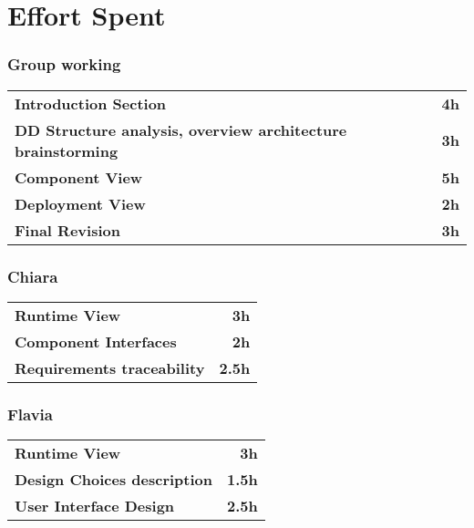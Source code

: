 \chapter{Effort Spent}
\subsection*{Group working}
\begin{table}[H]
    \begin{tabular}{lr}
        \toprule
        \textbf{Introduction Section}                                           & \textbf{4h} \\
        \textbf{DD Structure analysis, overview architecture brainstorming}     & \textbf{3h} \\
        \textbf{Component View}                                                 & \textbf{5h} \\
        \textbf{Deployment View}                                                  & \textbf{2h} \\
        \textbf{Final Revision}                                            & \textbf{3h} \\

        \bottomrule
    \end{tabular}
\end{table}

\subsection*{Chiara}
\begin{table}[H]
    \begin{tabular}{lr}
        \toprule
        \textbf{Runtime View}                                                  & \textbf{3h} \\
        \textbf{Component Interfaces}                                            & \textbf{2h} \\
        \textbf{Requirements traceability}                                         & \textbf{2.5h} \\
        \bottomrule
    \end{tabular}
\end{table}

\subsection*{Flavia}
\begin{table}[H]
    \begin{tabular}{lr}
        \toprule
        \textbf{Runtime View}                                                  & \textbf{3h} \\
        \textbf{Design Choices description}                                            & \textbf{1.5h}\\
        \textbf{User Interface Design}                                            & \textbf{2.5h} \\
        \bottomrule
    \end{tabular}
\end{table}

